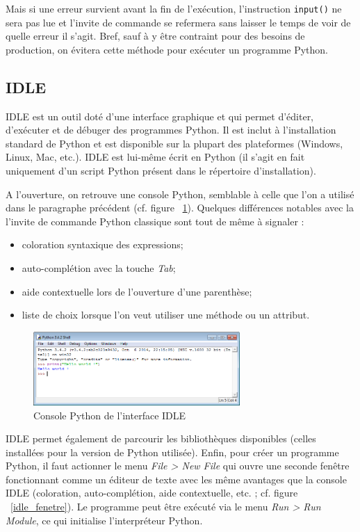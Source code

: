 \documentclass[12pt, a4paper]{article}
\begin{document}
Mais si une erreur survient avant la fin de l'exécution, l'instruction \lstinline{input()} ne sera pas lue et l'invite de commande se refermera sans laisser le temps de voir de quelle erreur il s'agit. Bref, sauf à y être contraint pour des besoins de production, on évitera cette méthode pour exécuter un programme Python.


\subsection{IDLE}
IDLE est un outil doté d'une interface graphique et qui permet d'éditer, d'exécuter et de débuger des programmes Python. Il est inclut à l'installation standard de Python et est disponible sur la plupart des plateformes (Windows, Linux, Mac, etc.). IDLE est lui-même écrit en Python (il s'agit en fait uniquement d'un script Python présent dans le répertoire d'installation).

A l'ouverture, on retrouve une console Python, semblable à celle que l'on a utilisé dans le paragraphe précédent (cf. figure ~\ref{idle_console}). Quelques différences notables avec la l'invite de commande Python classique sont tout de même à signaler :
\begin{itemize}
	\item coloration syntaxique des expressions;
	\item auto-complétion avec la touche \textit{Tab};
	\item aide contextuelle lors de l'ouverture d'une parenthèse;
	\item liste de choix lorsque l'on veut utiliser une méthode ou un attribut.
\end{itemize}

\begin{figure}[H]
	\center \includegraphics[width=0.7\textwidth]{img/idle_console.png}
	\caption{Console Python de l'interface IDLE}
	\label{idle_console}
\end{figure}

IDLE permet également de parcourir les bibliothèques disponibles (celles installées pour la version de Python utilisée). Enfin, pour créer un programme Python, il faut actionner le menu \textit{File > New File} qui ouvre une seconde fenêtre fonctionnant comme un éditeur de texte avec les même avantages que la console IDLE (coloration, auto-complétion, aide contextuelle, etc. ; cf. figure ~\ref{idle_fenetre}). Le programme peut être exécuté via le menu \textit{Run > Run Module}, ce qui initialise l'interpréteur Python.
\end{document}
